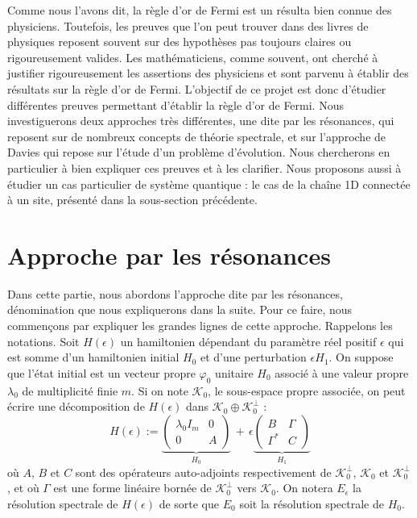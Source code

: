 \documentclass[12pt,openany,a4paper, titlepage]{article}
\newcommand{\vp}{\varphi}
\theoremstyle{definition}
\theoremstyle{definition}
\theoremstyle{definition}
\theoremstyle{definition}
\theoremstyle{definition}
\theoremstyle{definition}
\begin{document}
Comme nous l'avons dit, la règle d'or de Fermi est un résulta bien connue des physiciens. Toutefois, les preuves que l'on peut trouver dans des livres de physiques reposent souvent sur des hypothèses pas toujours claires ou rigoureusement valides. Les mathématiciens, comme souvent, ont cherché à justifier rigoureusement les assertions des physiciens et sont parvenu à établir des résultats sur la règle d'or de Fermi. L'objectif de ce projet est donc d'étudier différentes preuves permettant d'établir la règle d'or de Fermi. Nous investiguerons deux approches très différentes, une dite par les résonances, qui reposent sur de nombreux concepts de théorie spectrale, et sur l'approche de Davies qui repose sur l'étude d'un problème d'évolution. Nous chercherons en particulier à bien expliquer ces preuves et à les clarifier. Nous proposons aussi à étudier un cas particulier de système quantique : le cas de la chaîne 1D connectée à un site, présenté dans la sous-section précédente.


\newpage

\section{Approche par les résonances}

Dans cette partie, nous abordons l'approche dite par les résonances, dénomination que nous expliquerons dans la suite. Pour ce faire, nous commençons par expliquer les grandes lignes de cette approche.
Rappelons les notations. Soit $H(\epsilon)$ un hamiltonien dépendant du paramètre réel positif $\epsilon$ qui est somme d'un hamiltonien initial $H_0$ et d'une perturbation $\epsilon H_1$. On suppose que l'état initial est un vecteur propre $\vp_0$ unitaire $H_0$ associé à une valeur propre $\lambda_0$ de multiplicité finie $m$. Si on note $\mathcal{K}_0$, le sous-espace propre associée, on peut écrire une décomposition de $H(\epsilon)$ dans $\mathcal{K}_0 \oplus \mathcal{K}_0^\perp$ : 
$$H(\epsilon) := 
\underbrace{\begin{pmatrix}
\lambda_0I_m & 0 \\
0    & A 
\end{pmatrix}}_{H_0} \,+\, \epsilon
\underbrace{\begin{pmatrix}
B        & \Gamma \\
\Gamma^* &  C
\end{pmatrix}}_{H_1}$$
où $A$, $B$ et $C$ sont des opérateurs auto-adjoints respectivement de $\mathcal{K}_0^\perp$, $\mathcal{K}_0$ et $\mathcal{K}_0^\perp$, et où $\Gamma$ est une forme linéaire bornée de $\mathcal{K}_0^\perp$ vers $\mathcal{K}_0$.  On notera $E_\epsilon$ la résolution spectrale de $H(\epsilon)$ de sorte que $E_0$ soit la résolution spectrale de $H_0$.
\end{document}
